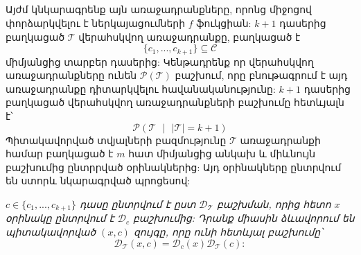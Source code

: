 \documentclass[12pt]{article}
\begin{document}
\begin{center}
\subsection*{
 } 
 \end{center}
 \noindent
{}
{}

\par Այժմ կնկարագրենք այն առաջադրանքները, որոնց միջոցով փորձարկվելու է ներկայացումների $f$ ֆուկցիան: $k+1$ դասերից բաղկացած $\mathcal{T}$ վերահսկվող առաջադրանքը, բաղկացած է $$\{c_1, ..., c_{k+1}\} \subseteq \mathcal{C}$$
միմյանցից տարբեր դասերից: Կենթադրենք որ վերահսկվող առաջադրանքները ունեն $\mathcal{P}(\mathcal{T})$ բաշխում, որը բնութագրում է այդ առաջադրանքը դիտարկվելու հավանականությունը: $k+1$ դասերից բաղկացած վերահսկվող առաջադրանքների բաշխումը հետևյալն է՝ $$\mathcal{P}(\mathcal{T} \text{ } |\text{ }  |\mathcal{T}| = k +1)$$ Պիտակավորված տվյալների բազմությունը $\mathcal{T}$ առաջադրանքի համար բաղկացած է $m$ հատ միմյանցից անկախ և միևնույն բաշխումից ընտրրված օրինակներից: Այդ օրինակները ընտրվում են ստորև նկարագրված պրոցեսով:

\textit{$c \in \{c_1, ..., c_{k+1}\} $   դասը ընտրվում է ըստ $\mathcal{D}_{\mathcal{T}}$ բաշխման, որից հետո $x$ օրինակը ընտրվում է $\mathcal{D}_c$ բաշխումից: Դրանք միասին ձևավորում են պիտակավորված $(x, c)$ զույգը, որը ունի հետևյալ բաշխումը՝
$$\mathcal{D}_{\mathcal{T}} (x, c) = \mathcal{D}_{c}(x)\mathcal{D}_{\mathcal{T}}(c):$$}

\begin{center}
\subsection*{
 } 
 \end{center}
 \noindent
{}
{}
\end{document}
